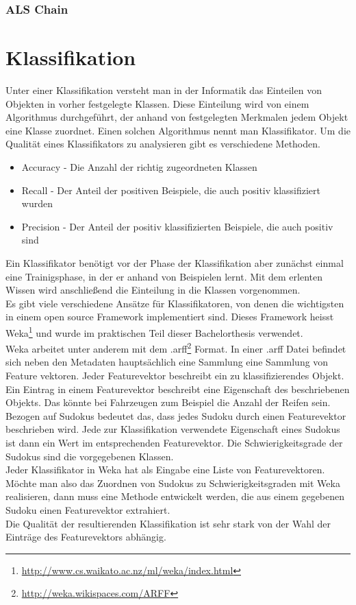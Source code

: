 \documentclass[accentcolor=tud6b,11pt,paper=a4]{tudreport}
\begin{document}
\newpage
\subsection{ALS Chain}

\chapter{Klassifikation}
Unter einer Klassifikation versteht man in der Informatik das Einteilen von Objekten in vorher festgelegte Klassen. Diese Einteilung wird von einem Algorithmus durchgeführt, der anhand von festgelegten Merkmalen jedem Objekt eine Klasse zuordnet. Einen solchen Algorithmus nennt man Klassifikator. Um die Qualität eines Klassifikators zu analysieren gibt es verschiedene Methoden.
\begin{itemize}
\item Accuracy - Die Anzahl der richtig zugeordneten Klassen
\item Recall - Der Anteil der positiven Beispiele, die auch positiv klassifiziert wurden
\item Precision - Der Anteil der positiv klassifizierten Beispiele, die auch positiv sind
\end{itemize}
Ein Klassifikator benötigt vor der Phase der Klassifikation aber zunächst einmal eine Trainigsphase, in der er anhand von Beispielen lernt. Mit dem erlenten Wissen wird anschließend die Einteilung in die Klassen vorgenommen.\\
Es gibt viele verschiedene Ansätze für Klassifikatoren, von denen die wichtigsten in einem open source Framework implementiert sind. Dieses Framework heisst Weka\footnote{\url{http://www.cs.waikato.ac.nz/ml/weka/index.html}} und wurde im praktischen Teil dieser Bachelorthesis verwendet.\\
Weka arbeitet unter anderem mit dem .arff\footnote{\url{http://weka.wikispaces.com/ARFF}} Format. In einer .arff Datei befindet sich neben den Metadaten hauptsächlich eine Sammlung eine Sammlung von Feature vektoren. Jeder Featurevektor beschreibt ein zu klassifizierendes Objekt. Ein Eintrag in einem Featurevektor beschreibt eine Eigenschaft des beschriebenen Objekts. Das könnte bei Fahrzeugen zum Beispiel die Anzahl der Reifen sein. Bezogen auf Sudokus bedeutet das, dass jedes Sudoku durch einen Featurevektor beschrieben wird. Jede zur Klassifikation verwendete Eigenschaft eines Sudokus ist dann ein Wert im entsprechenden Featurevektor. Die Schwierigkeitsgrade der Sudokus sind die vorgegebenen Klassen.\\
Jeder Klassifikator in Weka hat als Eingabe eine Liste von Featurevektoren. Möchte man also das Zuordnen von Sudokus zu Schwierigkeitsgraden mit Weka realisieren, dann muss eine Methode entwickelt werden, die aus einem gegebenen Sudoku einen Featurevektor extrahiert.\\
Die Qualität der resultierenden Klassifikation ist sehr stark von der Wahl der Einträge des Featurevektors abhängig.
\end{document}
